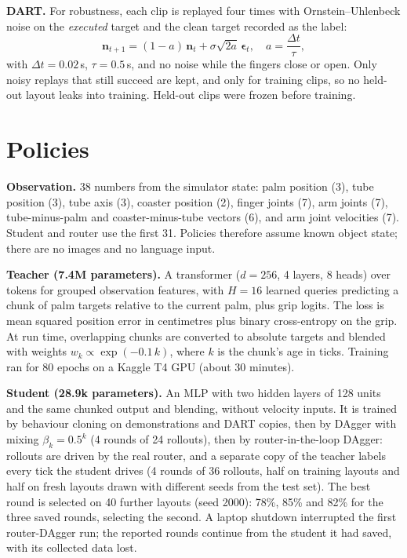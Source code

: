 \documentclass[10pt,twocolumn]{article}
\begin{document}
\textbf{DART.} For robustness, each clip is replayed four times with Ornstein--Uhlenbeck noise on the \emph{executed}
target and the clean target recorded as the label:
\begin{equation}
\mathbf{n}_{t+1} = (1-a)\,\mathbf{n}_t + \sigma\sqrt{2a}\,\boldsymbol{\epsilon}_t,\quad a=\frac{\Delta t}{\tau},
\end{equation}
with $\Delta t = 0.02$\,s, $\tau=0.5$\,s, and no noise while the fingers close or open. Only noisy replays that still
succeed are kept, and only for training clips, so no held-out layout leaks into training. Held-out clips were frozen
before training.

\section{Policies}
\textbf{Observation.} 38 numbers from the simulator state: palm position (3), tube position (3), tube axis (3),
coaster position (2), finger joints (7), arm joints (7), tube-minus-palm and coaster-minus-tube vectors (6), and arm
joint velocities (7). Student and router use the first 31. Policies therefore assume known object state; there are no
images and no language input.

\textbf{Teacher (7.4M parameters).} A transformer ($d{=}256$, 4 layers, 8 heads) over tokens for grouped observation
features, with $H{=}16$ learned queries predicting a chunk of palm targets relative to the current palm, plus grip
logits. The loss is mean squared position error in centimetres plus binary cross-entropy on the grip. At run time,
overlapping chunks are converted to absolute targets and blended with weights $w_k \propto \exp(-0.1\,k)$, where $k$
is the chunk's age in ticks. Training ran for 80 epochs on a Kaggle T4 GPU (about 30 minutes).

\textbf{Student (28.9k parameters).}\label{sec:student} An MLP with two hidden layers of 128 units and the same chunked
output and blending, without velocity inputs. It is trained by behaviour cloning on demonstrations and DART copies, then
by DAgger with mixing $\beta_k = 0.5^k$ (4 rounds of 24 rollouts), then by router-in-the-loop DAgger: rollouts are
driven by the real router, and a separate copy of the teacher labels every tick the student drives (4 rounds of 36
rollouts, half on training layouts and half on fresh layouts drawn with different seeds from the test set). The best
round is selected on 40 further layouts (seed 2000): 78\%, 85\% and 82\% for the three saved rounds, selecting the second.
A laptop shutdown interrupted the first router-DAgger run; the reported rounds continue from the student it had saved, with
its collected data lost.
\end{document}
